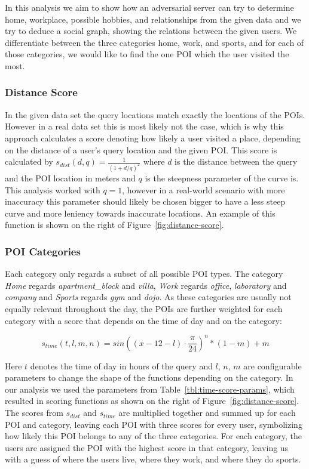 \documentclass[9pt,conference]{IEEEtran}
\begin{document}
In this analysis we aim to show how an adversarial server can try to determine home, workplace, possible hobbies, and relationships from the given data and we try to deduce a social graph, showing the relations between the given users. We differentiate between the three categories home, work, and sports, and for each of those categories, we would like to find the one POI which the user visited the most.

\subsubsection{Distance Score}
In the given data set the query locations match exactly the locations of the POIs. However in a real data set this is most likely not the case, which is why this approach calculates a score denoting how likely a user visited a place, depending on the distance of a user's query location and the given POI. This score is calculated by ${s_{dist}(d, q) = \frac{1}{(1+d/q)^2}}$ where $d$ is the distance between the query and the POI location in meters and $q$ is the steepness parameter of the curve is. This analysis worked with $q = 1$, however in a real-world scenario with more inaccuracy this parameter should likely be chosen bigger to have a less steep curve and more leniency towards inaccurate locations. An example of this function is shown on the right of Figure~\ref{fig:distance-score}.


\subsubsection{POI Categories}
Each category only regards a subset of all possible POI types. The category \textit{Home} regards \textit{apartment\_block} and \textit{villa}, \textit{Work} regards \textit{office}, \textit{laboratory} and \textit{company} and \textit{Sports} regards \textit{gym} and \textit{dojo}. As these categories are usually not equally relevant throughout the day, the POIs are further weighted for each category with a score that depends on the time of day and on the category:

$${s_{time}(t, l, m, n) = sin((x-12-l) \cdot \frac{\pi}{24})^n * (1-m) + m}$$

Here $t$ denotes the time of day in hours of the query and $l$, $n$, $m$ are configurable parameters to change the shape of the functions depending on the category. In our analysis we used the parameters from Table~\ref{tbl:time-score-params}, which resulted in scoring functions as shown on the right of Figure~\ref{fig:distance-score}. The scores from $s_{dist}$ and $s_{time}$ are multiplied together and summed up for each POI and category, leaving each POI with three scores for every user, symbolizing how likely this POI belongs to any of the three categories. For each category, the users are assigned the POI with the highest score in that category, leaving us with a guess of where the users live, where they work, and where they do sports.
\end{document}
